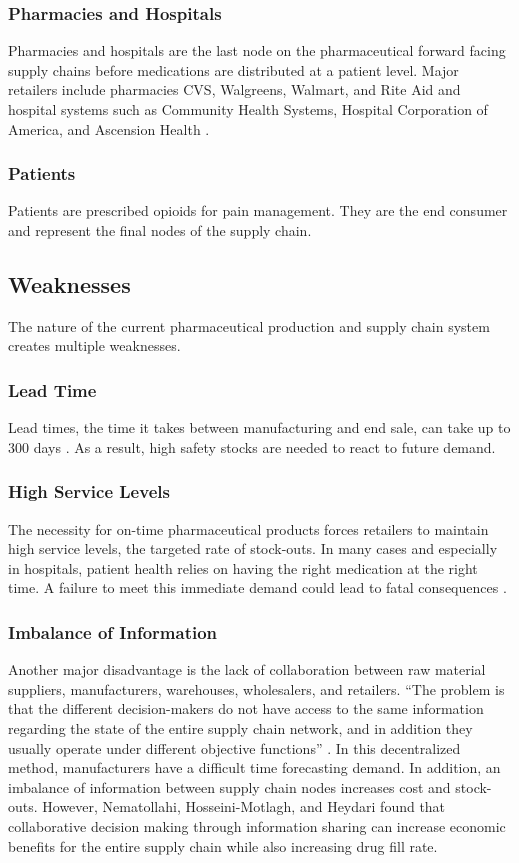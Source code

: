 \documentclass[sigconf]{acmart}
\begin{document}
\subsubsection{Pharmacies and Hospitals} Pharmacies and hospitals are the last node on the pharmaceutical forward facing supply chains before medications are distributed at a patient level. Major retailers include pharmacies CVS, Walgreens, Walmart, and Rite Aid and hospital systems such as Community Health Systems, Hospital Corporation of America, and Ascension Health \cite{Shah01}.

\subsubsection{Patients} Patients are prescribed opioids for pain management. They are the end consumer and represent the final nodes of the supply chain.

\subsection{Weaknesses}
The nature of the current pharmaceutical production and supply chain system creates multiple weaknesses. 

\subsubsection{Lead Time} Lead times, the time it takes between manufacturing and end sale, can take up to 300 days \cite{Shah01}. As a result, high safety stocks are needed to react to future demand.

\subsubsection{High Service Levels} The necessity for on-time pharmaceutical products forces retailers to maintain high service levels, the targeted rate of stock-outs. In many cases and especially in hospitals, patient health relies on having the right medication at the right time. A failure to meet this immediate demand could lead to fatal consequences \cite{Kelle01} \cite{Hua01}.

\subsubsection{Imbalance of Information} Another major disadvantage is the lack of collaboration between raw material suppliers, manufacturers, warehouses, wholesalers, and retailers. ``The problem is that the different decision-makers do not have access to the same information regarding the state of the entire supply chain network, and in addition they usually operate under different objective functions'' \cite{Sahay01}. In this decentralized method, manufacturers have a difficult time forecasting demand. In addition, an imbalance of information between supply chain nodes increases cost and stock-outs. However, Nematollahi, Hosseini-Motlagh, and Heydari \cite{Nematollahi01} found that collaborative decision making through information sharing can increase economic benefits for the entire supply chain while also increasing drug fill rate.
\end{document}
